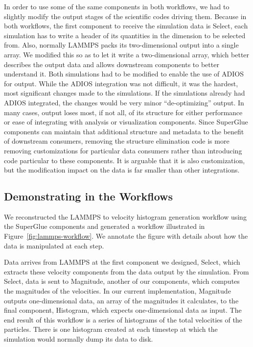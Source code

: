 \documentclass[conference]{IEEEtran}
\begin{document}
In order to use some of the same components in both workflows, we had to
slightly modify the output stages of the scientific codes driving them. Because
in both workflows, the first component to receive the simulation data is
Select, each simulation has to write a header of its quantities in the
dimension to be selected from. Also, normally LAMMPS packs its two-dimensional
output into a single array. We modified this so as to let it write a
two-dimensional array, which better describes the output data and allows
downstream components to better understand it. Both simulations had to be
modified to enable the use of ADIOS for output. While the ADIOS integration was
not difficult, it was the hardest, most significant changes made to the
simulations. If the simulations already had ADIOS integrated, the changes would
be very minor ``de-optimizing'' output. In many cases, output loses most, if
not all, of its structure for either performance or ease of integrating with
analysis or visualization components. Since SuperGlue components can maintain
that additional structure and metadata to the benefit of downstream consumers,
removing the structure elimination code is more removing customizations for
particular data consumers rather than introducing code particular to these
components. It is arguable that it is also customization, but the modification
impact on the data is far smaller than other integrations.

\subsection{Demonstrating in the Workflows}

We reconstructed the LAMMPS to velocity histogram generation workflow using the
SuperGlue components and generated a workflow illustrated in
Figure~\ref{fig:lammps-workflow}. We annotate the figure with details about how
the data is manipulated at each step.



Data arrives from LAMMPS at the first component we designed, Select, which
extracts these velocity components from the data output by the simulation. From
Select, data is sent to Magnitude, another of our components, which computes
the magnitudes of the velocities. In our current implementation, Magnitude
outputs one-dimensional data, an array of the magnitudes it calculates, to the
final component, Histogram, which expects one-dimensional data as input. The
end result of this workflow is a series of histograms of the total velocities
of the particles. There is one histogram created at each timestep at which the
simulation would normally dump its data to disk.
\end{document}
